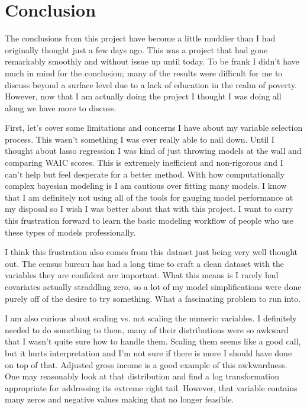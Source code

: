 \section*{Conclusion}

The conclusions from this project have become a little muddier than I had originally thought just a few days ago. This was a project that had gone remarkably smoothly and without issue up until today. To be frank I didn't have much in mind for the conclusion; many of the results were difficult for me to discuss beyond a surface level due to a lack of education in the realm of poverty. However, now that I am actually doing the project I thought I was doing all along we have more to discuss.

First, let's cover some limitations and concerns I have about my variable selection process. This wasn't something I was ever really able to nail down. Until I thought about lasso regression I was kind of just throwing models at the wall and comparing WAIC scores. This is extremely inefficient and non-rigorous and I can't help but feel desperate for a better method. With how computationally complex bayesian modeling is I am cautious over fitting many models. I know that I am definitely not using all of the tools for gauging model performance at my disposal so I wish I was better about that with this project. I want to carry this frustration forward to learn the basic modeling workflow of people who use these types of models professionally. 

I think this frustration also comes from this dataset just being very well thought out. The census bureau has had a long time to craft a clean dataset with the variables they are confident are important. What this means is I rarely had covariates actually straddling zero, so a lot of my model simplifications were done purely off of the desire to try something. What a fascinating problem to run into. 

I am also curious about scaling vs. not scaling the numeric variables. I definitely needed to do something to them, many of their distributions were so awkward that I wasn't quite sure how to handle them. Scaling them seems like a good call, but it hurts interpretation and I'm not sure if there is more I should have done on top of that. Adjusted gross income is a good example of this awkwardness. One may reasonably look at that distribution and find a log transformation appropriate for addressing its extreme right tail. However, that variable contains many zeros and negative values making that no longer feasible. 

